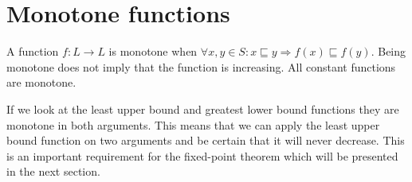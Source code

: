 \section{Monotone functions}
A function $f: L \to L$ is monotone when $\forall x,y \in S : x \sqsubseteq y \Rightarrow f(x) \sqsubseteq f(y)$.
Being monotone does not imply that the function is increasing.
All constant functions are monotone.

If we look at the least upper bound and greatest lower bound functions they are monotone in both arguments.
This means that we can apply the least upper bound function on two arguments and be certain that it will never decrease.
This is an important requirement for the fixed-point theorem which will be presented in the next section.
